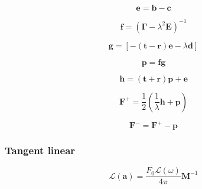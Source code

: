 \begin{equation}
\mathbf{e} = \mathbf{b} - \mathbf{c}
\label{eq:solar_source-local_solar_source-classical_reduced_order-forward-e}
\end{equation}

\begin{equation}
\mathbf{f} = \left(\mathbf{\Gamma} - \lambda^{2}\mathbf{E}\right)^{-1}
\label{eq:solar_source-local_solar_source-classical_reduced_order-forward-f}
\end{equation}

\begin{equation}
\mathbf{g} = \left[-(\mathbf{t} - \mathbf{r})\mathbf{e} - \lambda\mathbf{d}\right]
\label{eq:solar_source-local_solar_source-classical_reduced_order-forward-g}
\end{equation}

\begin{equation}
\mathbf{p} = \mathbf{f}\mathbf{g}
\label{eq:solar_source-local_solar_source-classical_reduced_order-forward-p}
\end{equation}

\begin{equation}
\mathbf{h} = (\mathbf{t} + \mathbf{r})\mathbf{p} + \mathbf{e}
\label{eq:solar_source-local_solar_source-classical_reduced_order-forward-h}
\end{equation}

\begin{equation}
\mathbf{F}^{+} = \frac{1}{2}(\frac{1}{\lambda}\mathbf{h} + \mathbf{p})
\label{eq:solar_source-local_solar_source-classical_reduced_order-forward-F_p}
\end{equation}

\begin{equation}
\mathbf{F}^{-} = \mathbf{F}^{+} - \mathbf{p}
\label{eq:solar_source-local_solar_source-classical_reduced_order-forward-F_m}
\end{equation}


%
\subsubsection{Tangent linear}
\label{sec:solar_source-local_solar_source-classical_reduced_order-tangent_linear}

\begin{equation}
\mathcal{L}(\mathbf{a}) = \frac{F_{0}\mathcal{L}(\omega)}{4\pi} \mathbf{M}^{-1}
\label{eq:solar_source-local_solar_source-classical_reduced_order-tangent_linear-a_l}
\end{equation}

